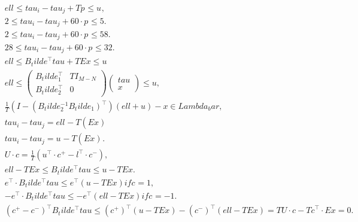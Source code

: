 \begin{align}
  & \mathit{ell}_{} \leq \mathit{tau}_{i} - \mathit{tau}_{j} + \mathit{Tp}_{} \leq u_{} , \tag{eq\_0001} \\
  & 2 \leq \mathit{tau}_{i} - \mathit{tau}_{j} + 60 \cdot p_{} \leq 5 . \tag{eq\_0002} \\
  & 2 \leq \mathit{tau}_{i} - \mathit{tau}_{j} + 60 \cdot p_{} \leq 58 . \tag{eq\_0003} \\
  & 28 \leq \mathit{tau}_{i} - \mathit{tau}_{j} + 60 \cdot p_{} \leq 32 . \tag{eq\_0004} \\
  & \mathit{ell} \leq B_tilde^{\top} \mathit{tau} + \mathit{TEx} \leq u \tag{eq\_0014} \\
  & \mathit{ell} \leq \begin{pmatrix} B_tilde_{1}^{\top} & \mathit{TI}_{M - N} \\ B_tilde_{2}^{\top} & 0 \end{pmatrix} \begin{pmatrix} \mathit{tau} \\ x \end{pmatrix} \leq u , \tag{eq\_0015} \\
  & \frac{1}{T} \left(I - \left(\right. B_tilde_{2}^{- 1} B_tilde_{1} \left.\right)^{\top}\right) \left(\mathit{ell} + u\right) - x \in Lambda_bar , \tag{eq\_0016} \\
  & \mathit{tau}_{i} - \mathit{tau}_{j} = \mathit{ell}_{} - T \left(\right. \mathit{Ex} \left.\right)_{} \tag{eq\_0017} \\
  & \mathit{tau}_{i} - \mathit{tau}_{j} = u_{} - T \left(\right. \mathit{Ex} \left.\right)_{} . \tag{eq\_0018} \\
  & U \cdot c = \frac{1}{T} \left(u^{\top} \cdot c^{+} - l^{\top} \cdot c^{-}\right) , \tag{eq\_0019} \\
  & \mathit{ell} - \mathit{TEx} \leq B_tilde^{\top} \mathit{tau} \leq u - \mathit{TEx} . \tag{eq\_0021} \\
  & e_{}^{\top} \cdot B_tilde^{\top} \mathit{tau} \leq e_{}^{\top} \left(u - \mathit{TEx}\right) if c_{} = 1 , \tag{eq\_0022} \\
  & - e_{}^{\top} \cdot B_tilde^{\top} \mathit{tau} \leq - e_{}^{\top} \left(\mathit{ell} - \mathit{TEx}\right) if c_{} = - 1 . \tag{eq\_0023} \\
  & \left(\right. c^{+} - c^{-} \left.\right)^{\top} B_tilde^{\top} \mathit{tau} \leq \left(\right. c^{+} \left.\right)^{\top} \left(u - \mathit{TEx}\right) - \left(\right. c^{-} \left.\right)^{\top} \left(\mathit{ell} - \mathit{TEx}\right) = \mathit{TU} \cdot c - \mathit{Tc}^{\top} \cdot \mathit{Ex} = 0 . \tag{eq\_0024} \\

\end{align}
